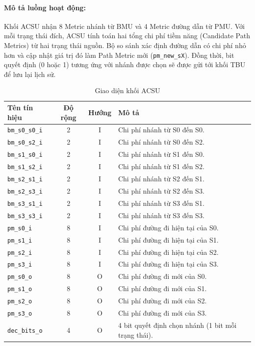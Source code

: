 \documentclass[12pt,a4paper]{report}
\begin{document}
\paragraph{Mô tả luồng hoạt động:}
Khối ACSU nhận 8 Metric nhánh từ BMU và 4 Metric đường dẫn từ PMU. Với mỗi trạng thái đích, ACSU tính toán hai tổng chi phí tiềm năng (Candidate Path Metrics) từ hai trạng thái nguồn. Bộ so sánh xác định đường dẫn có chi phí nhỏ hơn và cập nhật giá trị đó làm Path Metric mới (\texttt{pm\_new\_sX}). Đồng thời, bit quyết định (0 hoặc 1) tương ứng với nhánh được chọn sẽ được gửi tới khối TBU để lưu lại lịch sử.

\begin{table}[H]
    \centering
    \caption{Giao diện khối ACSU}
    \begin{tabularx}{\textwidth}{|l|c|c|X|}
    \hline
    \textbf{Tên tín hiệu} & \textbf{Độ rộng} & \textbf{Hướng} & \textbf{Mô tả} \\ \hline
    \texttt{bm\_s0\_s0\_i} & 2 & I & Chi phí nhánh từ S0 đến S0. \\ \hline
    \texttt{bm\_s0\_s2\_i} & 2 & I & Chi phí nhánh từ S0 đến S2. \\ \hline
    \texttt{bm\_s1\_s0\_i} & 2 & I & Chi phí nhánh từ S1 đến S0. \\ \hline
    \texttt{bm\_s1\_s2\_i} & 2 & I & Chi phí nhánh từ S1 đến S2. \\ \hline
    \texttt{bm\_s2\_s1\_i} & 2 & I & Chi phí nhánh từ S2 đến S1. \\ \hline
    \texttt{bm\_s2\_s3\_i} & 2 & I & Chi phí nhánh từ S2 đến S3. \\ \hline
    \texttt{bm\_s3\_s1\_i} & 2 & I & Chi phí nhánh từ S3 đến S1. \\ \hline
    \texttt{bm\_s3\_s3\_i} & 2 & I & Chi phí nhánh từ S3 đến S3. \\ \hline
    \texttt{pm\_s0\_i} & 8 & I & Chi phí đường đi hiện tại của S0. \\ \hline
    \texttt{pm\_s1\_i} & 8 & I & Chi phí đường đi hiện tại của S1. \\ \hline
    \texttt{pm\_s2\_i} & 8 & I & Chi phí đường đi hiện tại của S2. \\ \hline
    \texttt{pm\_s3\_i} & 8 & I & Chi phí đường đi hiện tại của S3. \\ \hline
    \texttt{pm\_s0\_o} & 8 & O & Chi phí đường đi mới của S0. \\ \hline
    \texttt{pm\_s1\_o} & 8 & O & Chi phí đường đi mới của S1. \\ \hline
    \texttt{pm\_s2\_o} & 8 & O & Chi phí đường đi mới của S2. \\ \hline
    \texttt{pm\_s3\_o} & 8 & O & Chi phí đường đi mới của S3. \\ \hline
    \texttt{dec\_bits\_o} & 4 & O & 4 bit quyết định chọn nhánh (1 bit mỗi trạng thái). \\ \hline
    \end{tabularx}
\end{table}
\end{document}
